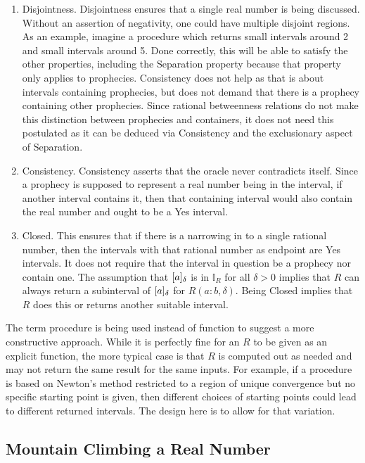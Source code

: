 \documentclass[12pt]{article}
\begin{document}
\begin{enumerate}
    \item Disjointness. Disjointness ensures that a single real number is being discussed. Without an assertion of negativity, one could have multiple disjoint regions.  As an example, imagine a procedure which returns small intervals around 2 and small intervals around 5. Done correctly, this will be able to satisfy the other properties, including the Separation property because that property only applies to prophecies. Consistency does not help as that is about intervals containing prophecies, but does not demand that there is a prophecy containing other prophecies.  Since rational betweenness relations do not make this distinction between prophecies and containers, it does not need this postulated as it can be deduced via Consistency and the exclusionary aspect of Separation. 
    
    \item Consistency. Consistency asserts that the oracle never contradicts itself. Since a prophecy is supposed to represent a real number being in the interval, if another interval contains it, then that containing interval would also contain the real number and ought to be a Yes interval. 
    
    \item Closed. This ensures that if there is a narrowing in to a single rational number, then the intervals with that rational number as endpoint are Yes intervals. It does not require that the interval in question be a prophecy nor contain one. The assumption that $[a]_{\delta}$ is in $\mathbb{I}_R$ for all $\delta >0$ implies that $R$ can always return a subinterval of $[a]_{\delta}$ for $R(a:b, \delta)$. Being Closed implies that $R$ does this or returns another suitable interval. 

\end{enumerate}

The term procedure is being used instead of function to suggest a more constructive approach. While it is perfectly fine for an $R$ to be given as an explicit function, the more typical case is that $R$ is computed out as needed and may not return the same result for the same inputs. For example, if a procedure is based on Newton's method restricted to a region of unique convergence but no specific starting point is given, then different choices of starting points could lead to different returned intervals. The design here is to allow for that variation. 


\subsection{Mountain Climbing a Real Number}
\end{document}
